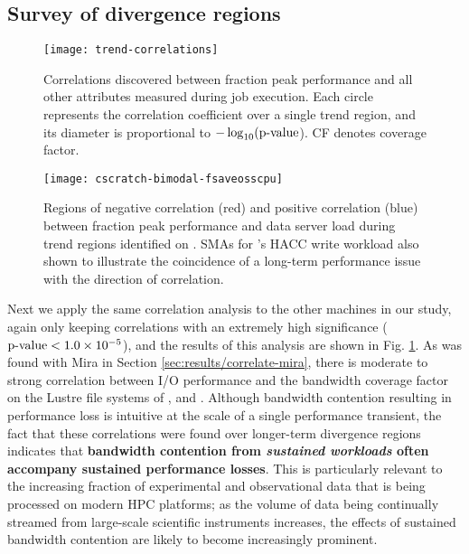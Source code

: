 \subsection{Survey of divergence regions} \label{sec:results/correlate-all}




\begin{figure}
    \centering
    \texttt{[image: trend-correlations]}
    \vspace{-.35in}
    \caption{Correlations discovered between fraction peak performance and all other attributes measured during job execution.
    Each circle represents the correlation coefficient over a single trend region, and its diameter is proportional to $-\log_{10}(\textup{p-value}$).
    CF denotes coverage factor.}
    \label{fig:trend-correlations}
\end{figure}


\begin{figure}
    \centering
    \texttt{[image: cscratch-bimodal-fsaveosscpu]}
    \vspace{-.35in}
    \caption{Regions of negative correlation (red) and positive correlation (blue) between fraction peak performance and data server load during trend regions identified on \cori.
    SMAs for \cori's HACC write workload also shown to illustrate the coincidence of a long-term performance issue with the direction of correlation.}
    \label{fig:cscratch-bimodal-fsaveosscpu}
\end{figure}

Next we apply the same correlation analysis to the other machines in our study, again only keeping correlations with an extremely high significance ($\textup{p-value} < {1.0 \times 10^{-5}}$), and the results of this analysis are shown in Fig. \ref{fig:trend-correlations}.
As was found with Mira in Section \ref{sec:results/correlate-mira}, there is moderate to strong correlation between I/O performance and the bandwidth coverage factor on the Lustre file systems of \cori, and \edison.
Although bandwidth contention resulting in performance loss is intuitive at the scale of a single performance transient, the fact that these correlations were found over longer-term divergence regions indicates that \textbf{bandwidth contention from \emph{sustained workloads} often accompany sustained performance losses}.
This is particularly relevant to the increasing fraction of experimental and observational data that is being processed on modern HPC platforms; as the volume of data being continually streamed from large-scale scientific instruments increases, the effects of sustained bandwidth contention are likely to become increasingly prominent.

